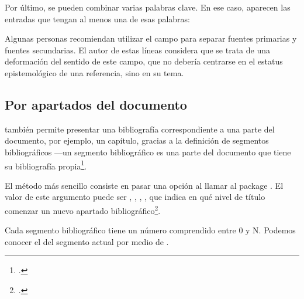 Por último, se pueden combinar varias palabras clave. En ese caso, aparecen las entradas que tengan al menos una de esas palabras:

\begin{latexcode}
\printbibliography[keyword=positivistas, keyword=naturalistas]
\end{latexcode}

\begin{plusloins}
    Algunas personas recomiendan utilizar el campo  para separar fuentes primarias y fuentes secundarias. El autor de estas líneas considera que se trata de una deformación del sentido de este campo, que no debería centrarse en el estatus epistemológico de una referencia, sino en su tema. 
\end{plusloins}

\subsection{Por apartados del documento}

 también permite presentar una bibliografía correspondiente a una parte del documento, por ejemplo, un capítulo, gracias a la definición de segmentos bibliográficos ---un segmento bibliográfico es una parte del documento que tiene su bibliografía propia\footcites[En realidad,  ofrece dos cosas distintas: \enquote{segment} y \enquote{section} bibliográficos. Sólo las secciones bibliográficas son realmente una bibliografía propiamente, en la medida en que, si se emplea un estilo numerado de bibliografía, la numeración se reinicia con cada cambio de apartado, pero no con cada cambio de segmento. No obstante, es raro utilizar en humanidades un estilo bibliográfico numerado. Por eso sólo hablamos aquí de segmentos bibliográficos y no de secciones bibliográficas. Véase:][así como:]{biblatex_section}[][]{biblatex_segment}.

El método más sencillo consiste en pasar una opción  al llamar al  package . El valor de este argumento puede ser , , , , que indica en qué nivel de título comenzar un nuevo apartado bibliográfico\footcite[También se pueden crear apartados bibliográficos de un modo distinto al de nivel de título, véase:][]{biblatex_segment}.

Cada segmento bibliográfico tiene un número comprendido entre 0 y N. Podemos conocer el del segmento actual por medio de .

